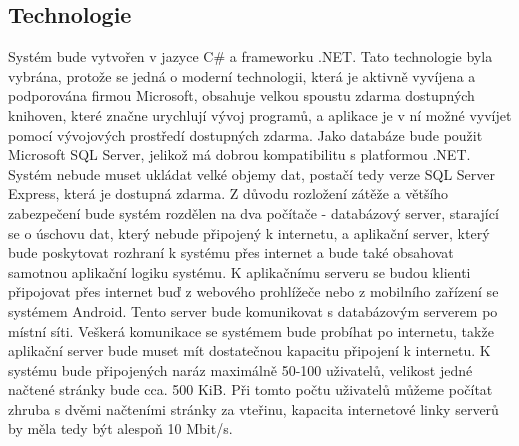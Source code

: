 \documentclass[a4paper,10pt,titlepage]{article}
\begin{document}
	\subsection{Technologie}
		Systém bude vytvořen v jazyce C\# a frameworku .NET. Tato technologie byla vybrána, protože se jedná o moderní technologii, která je aktivně vyvíjena a podporována firmou Microsoft, obsahuje velkou spoustu zdarma dostupných knihoven, které značne urychlují vývoj programů, a aplikace je v ní možné vyvíjet pomocí vývojových prostředí dostupných zdarma. Jako databáze bude použit Microsoft SQL Server, jelikož má dobrou
		kompatibilitu s platformou .NET. Systém nebude muset ukládat velké objemy dat, postačí tedy verze SQL Server Express, která je dostupná zdarma.
		Z důvodu rozložení zátěže a většího zabezpečení bude systém rozdělen na dva počítače - databázový server, starající se o
		úschovu dat, který nebude připojený k internetu, a aplikační server, který bude poskytovat rozhraní k systému přes internet a bude také obsahovat
		samotnou aplikační logiku systému. K aplikačnímu serveru se budou klienti připojovat přes internet buď z webového prohlížeče nebo z mobilního zařízení
		se systémem Android. Tento server bude komunikovat s databázovým serverem po místní síti. Veškerá komunikace se systémem bude probíhat po internetu, takže
		aplikační server bude muset mít dostatečnou kapacitu připojení k internetu. K systému bude připojených naráz maximálně 50-100 uživatelů, velikost jedné
		načtené stránky bude cca. 500 KiB. Při tomto počtu uživatelů můžeme počítat zhruba s dvěmi načteními stránky za vteřinu, kapacita internetové linky
		serverů by měla tedy být alespoň 10 Mbit/s.
\end{document}
